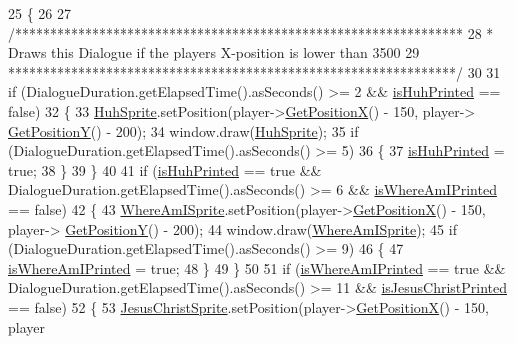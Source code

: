 \begin{DoxyCode}
25     \{
26 
27     \textcolor{comment}{/****************************************************************}
28 \textcolor{comment}{     * Draws this Dialogue if the players X-position is lower than 3500}
29 \textcolor{comment}{     ****************************************************************/}
30 
31         \textcolor{keywordflow}{if} (DialogueDuration.getElapsedTime().asSeconds() >= 2 && \hyperlink{classDialogue_afc51238031a3b5e1cf32e008d11c03c8}{isHuhPrinted} == \textcolor{keyword}{false})
32         \{
33             \hyperlink{classDialogue_ae6af9a5ea9b38c71cf31cfef5c213e39}{HuhSprite}.setPosition(player->\hyperlink{classPlayerObject_aa84a7779304b680fa32b88b01ba95d02}{GetPositionX}() - 150, player->
      \hyperlink{classPlayerObject_ad17b9ec44299f4dc9ca20064c883496b}{GetPositionY}() - 200);
34             window.draw(\hyperlink{classDialogue_ae6af9a5ea9b38c71cf31cfef5c213e39}{HuhSprite});
35             \textcolor{keywordflow}{if} (DialogueDuration.getElapsedTime().asSeconds() >= 5)
36             \{
37                     \hyperlink{classDialogue_afc51238031a3b5e1cf32e008d11c03c8}{isHuhPrinted} = \textcolor{keyword}{true};
38             \}
39         \}
40 
41         \textcolor{keywordflow}{if} (\hyperlink{classDialogue_afc51238031a3b5e1cf32e008d11c03c8}{isHuhPrinted} == \textcolor{keyword}{true} && DialogueDuration.getElapsedTime().asSeconds() >= 6 && 
      \hyperlink{classDialogue_a899dd954c7bd34a08abf802818f2765f}{isWhereAmIPrinted} == \textcolor{keyword}{false})
42         \{
43             \hyperlink{classDialogue_a1f385137c38c6adee1eef6f32f4abefd}{WhereAmISprite}.setPosition(player->\hyperlink{classPlayerObject_aa84a7779304b680fa32b88b01ba95d02}{GetPositionX}() - 150, player->
      \hyperlink{classPlayerObject_ad17b9ec44299f4dc9ca20064c883496b}{GetPositionY}() - 200);
44             window.draw(\hyperlink{classDialogue_a1f385137c38c6adee1eef6f32f4abefd}{WhereAmISprite});
45             \textcolor{keywordflow}{if} (DialogueDuration.getElapsedTime().asSeconds() >= 9)
46             \{
47                 \hyperlink{classDialogue_a899dd954c7bd34a08abf802818f2765f}{isWhereAmIPrinted} = \textcolor{keyword}{true};
48             \}
49         \}
50 
51         \textcolor{keywordflow}{if} (\hyperlink{classDialogue_a899dd954c7bd34a08abf802818f2765f}{isWhereAmIPrinted} == \textcolor{keyword}{true} && DialogueDuration.getElapsedTime().asSeconds() >= 
      11 && \hyperlink{classDialogue_a54544b789f4b8a06542f20c37ce6b2e0}{isJesusChristPrinted} == \textcolor{keyword}{false})
52         \{
53             \hyperlink{classDialogue_a878b13ffe10617ab228e8630c53dcdca}{JesusChristSprite}.setPosition(player->\hyperlink{classPlayerObject_aa84a7779304b680fa32b88b01ba95d02}{GetPositionX}() - 150, player

\end{DoxyCode}

